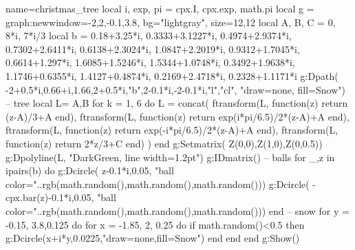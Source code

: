 \documentclass[border=5pt]{standalone}%
\begin{document}
\begin{luadraw}{name=christmas_tree}
local i, exp, pi = cpx.I, cpx.exp, math.pi
local g = graph:new{window={-2,2,-0.1,3.8}, bg="lightgray", size={12,12} } 
local A, B, C = 0, 8*i, 7*i/3
local b = { 0.18+3.25*i, 0.3333+3.1227*i, 0.4974+2.9374*i, 0.7302+2.6411*i, 0.6138+2.3024*i, 1.0847+2.2019*i, 0.9312+1.7045*i, 0.6614+1.297*i, 1.6085+1.5246*i, 1.5344+1.0748*i, 0.3492+1.9638*i, 1.1746+0.6355*i, 1.4127+0.4874*i, 0.2169+2.4718*i, 0.2328+1.1171*i }
g:Dpath( {-2+0.5*i,0.66+i,1.66,2+0.5*i,"b",2-0.1*i,-2-0.1*i,"l","cl"}, "draw=none, fill=Snow")
-- tree
local L= {{A,B}}
for k = 1, 6 do
    L = concat( 
            ftransform(L, function(z) return (z-A)/3+A end),
            ftransform(L, function(z) return exp(i*pi/6.5)/2*(z-A)+A end),
            ftransform(L, function(z) return exp(-i*pi/6.5)/2*(z-A)+A end),
            ftransform(L, function(z) return 2*z/3+C end)
            )
end
g:Setmatrix( {Z(0,0),Z(1,0),Z(0,0.5)})
g:Dpolyline(L, "DarkGreen, line width=1.2pt")
g:IDmatrix()
-- balls
for _,z in ipairs(b) do
    g:Dcircle( z-0.1*i,0.05, "ball color="..rgb(math.random(),math.random(),math.random()))
    g:Dcircle( -cpx.bar(z)-0.1*i,0.05, "ball color="..rgb(math.random(),math.random(),math.random()))
end
-- snow
for y = -0.15, 3.8,0.125  do
   for x = -1.85, 2, 0.25 do
        if math.random()<0.5 then g:Dcircle(x+i*y,0.0225,"draw=none,fill=Snow") end
   end
end 
g:Show()
\end{luadraw}
\end{document}
